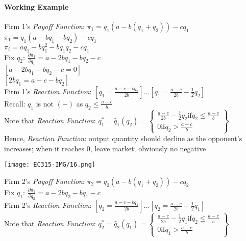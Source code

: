 \documentclass[11pt, english]{article}
\begin{document}
		\paragraph{Working Example}

	Firm 1's \textit{Payoff Function}: $\pi_1=q_1(a-b(q_1+q_2))-cq_1$\\
	$\pi_1=q_1(a-bq_1-bq_2)-cq_1$\\
	$\pi_i=aq_1-bq_1^2-bq_1q_2-cq_1$\\

	Fix $q_2$: $\frac{\partial\pi_1}{\partial q_1}=a-2bq_1-bq_2-c$\\
	$[a-2bq_1-bq_2-c=0]$\\
	$[2bq_1=a-c-bq_2]$\\

	Firm 1's \textit{Reaction Function}: $[q_1=\frac{a-c-bq_2}{2b}]...[q_1=\frac{a-c}{2b}-\frac{1}{2}q_2]$\\
	Recall: $q_1$ is not $(-)$ as $q_2\le\frac{a-c}{b}$\\

	Note that \textit{Reaction Function}: $q_1^*=\hat{q}_1(q_2)=\begin{Bmatrix}\frac{a-c}{2b}-\frac{1}{2}q_2\mathrm{if}q_2\le\frac{a-c}{b}\\0\mathrm{if}q_2>\frac{a-c}{b}\end{Bmatrix}$\\

	Hence, \textit{Reaction Function}: output quantity should decline as the opponent's increases; when it reaches 0, leave market; obviously no negative

	\begin{center}
		\texttt{[image: EC315-IMG/16.png]}
	\end{center}

	Firm 2's \textit{Payoff Function}: $\pi_2=q_2(a-b(q_1+q_2))-cq_2$\\
	Fix $q_1$: $\frac{\partial\pi_2}{\partial q_2}=a-2bq_2-bq_1-c$\\
	Firm 2's \textit{Reaction Function}: $[q_2=\frac{a-c-bq_1}{2b}]...[q_2=\frac{a-c}{2b}-\frac{1}{2}q_1]$\\

	Note that \textit{Reaction Function}: $q_2^*=\hat{q}_2(q_1)=\begin{Bmatrix}\frac{a-c}{2b}-\frac{1}{2}q_1\mathrm{if}q_2\le\frac{a-c}{b}\\0\mathrm{if}q_1>\frac{a-c}{b}\end{Bmatrix}$
	
\end{document}

